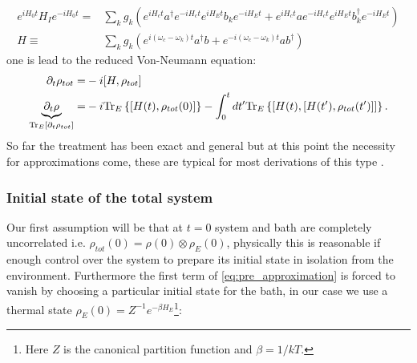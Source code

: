 \begin{align}
  e^{iH_{0}t} H_{I}e^{-iH_{0}t} =& \sum_{k}g_{k}\left(e^{iH_{c}t}a^{\dagger}e^{-iH_{c}t} e^{iH_{E}t}b_{k}e^{-iH_{E}t} +
                                   e^{iH_{c}t}ae^{-iH_{c}t} e^{iH_{E}t}b_{k}^{\dagger}e^{-iH_{E}t}\right)\\
  H\equiv & \sum_{k} g_{k} \left( e^{i(\omega_{c}-\omega_{k})t}a^{\dagger}b +   e^{-i(\omega_{c}-\omega_{k})t}ab^{\dagger} \right)
\end{align}
one is lead to the reduced Von-Neumann equation:
\begin{align}
  \partial_{t}\rho_{tot} =& -i[H, \rho_{tot}]\\
 \underbrace{\partial_{t}\rho}_{\mathrm{Tr}_{E}\left[\partial_{t}\rho_{tot}\right]} =& -i\mathrm{Tr}_{E}\left\{[H(t), \rho_{tot}(0)]\right\} - \int_{0}^{t}dt'\mathrm{Tr}_{E}\left\{[H(t), [H(t'), \rho_{tot}(t')]]\right\}.\label{eq:pre_approximation}
\end{align}
So far the treatment has been exact and general but at this point the necessity for approximations come, these are typical for most derivations
of this type \cite{hornberger2009introduction,wiseman_quantum_2010,breuer2002theory}.
\subsubsection{Initial state of the total system}
Our first assumption will be that at $t=0$ system and bath are completely uncorrelated i.e. $\rho_{tot}(0)=\rho(0)\otimes \rho_{E}(0)$,
physically this is reasonable if enough control over the system to prepare its initial state in isolation from the environment.
Furthermore the first term of \eqref{eq:pre_approximation} is forced to vanish by choosing a particular initial state for the bath, in our case
we use a thermal state $\rho_{E}(0)=Z^{-1}e^{-\beta H_{E}}$\footnote{Here $Z$ is the canonical partition function and $\beta=1/kT$.}:

